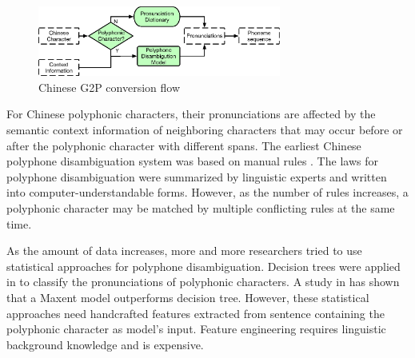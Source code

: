 \documentclass[a4paper]{article}
\begin{document}
\begin{figure}[t]
	
	\begin{minipage}[b]{1.0\linewidth}
		\centerline{\includegraphics[width=8cm]{pics3/ChineseG2P.eps}}
	\end{minipage}
	\caption{Chinese G2P conversion flow}
	\label{fig:chineseG2P}
\end{figure}

For Chinese polyphonic characters, their pronunciations are affected by the semantic context information \cite{lilinhui2010} of neighboring characters that may occur before or after the polyphonic character with different spans. The earliest Chinese polyphone disambiguation system was based on manual rules \cite{dajunzhang2000, lianhongcai1995}. The laws for polyphone disambiguation were summarized by linguistic experts  and written into computer-understandable forms. However, as the number of rules increases, a polyphonic character may be matched by multiple conflicting rules at the same time.

As the amount of data increases, more and more researchers tried to use statistical approaches for polyphone disambiguation. Decision trees were applied in \cite{wang1996broad} to classify the pronunciations of polyphonic characters. A study in \cite{fangzhouliu2007} has shown that a Maxent model outperforms decision tree. However, these statistical approaches need handcrafted features extracted from sentence containing the polyphonic character as model's input. Feature engineering requires linguistic background knowledge and is expensive.
\end{document}
